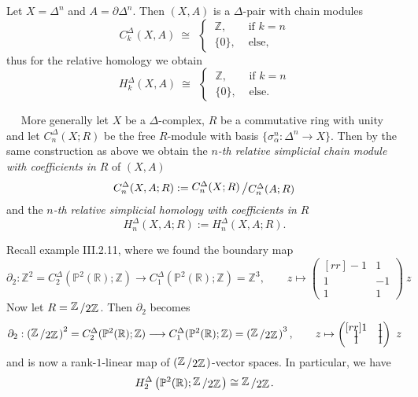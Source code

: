 \documentclass[11pt]{book}
\numberwithin{dummy}{section}
\theoremstyle{nonumberbreak}
\newenvironment{defin}[1][]{\ifthenelse{\equal{#1}{}}{\definition}{\definition[#1]}\rm}{\enddefinition}
\newenvironment{ex}[1][]{\ifthenelse{\equal{#1}{}}{\example}{\example[#1]}\rm}{\endexample}
\newcommand{\la}{\longrightarrow}
\newcommand{\slant}[2]{{\raisebox{.1em}{$#1$}\left/\raisebox{-.1em}{$#2$}\right.}}
\begin{document}
\begin{spacing}{1.4}
\begin{defin}
\end{defin}


\begin{ex}
Let $X= \Delta^n$ and $A= \partial \Delta^n$. Then $(X,A)$ is a $\Delta$-pair with chain modules
$$C_k^{\Delta}(X,A)\ \cong  \ \ \begin{cases} \ \mathbb{Z}, & \textrm{ if } k=n\\ \ \{0\}, & \textrm{ else,} \end{cases}$$
thus for the relative homology we obtain 
$$H_k^{\Delta}(X,A)\ \cong \ \ \begin{cases} \ \mathbb{Z}, & \textrm{ if } k=n\\ \ \{0\}, & \textrm{ else.} \end{cases}$$

\end{ex}



$\quad$ More generally let $X$ be a $\Delta$-complex, $R$ be a commutative ring with unity and let $C_n^{\Delta}(X;R)$ be the free $R$-module with basis $\{ \sigma_{\alpha}^n: \Delta^n \la X\}$. Then by the same construction as above we obtain the $n$\textit{-th relative simplicial chain module with coefficients in} $R$ of $(X,A)$
$$C_n^{\Delta}(X,A;R) := \slant{C_n^{\Delta}(X;R)}{C_n^{\Delta}(A;R)}$$
and the $n$\textit{-th relative simplicial homology with coefficients in} $R$
$$H_n^{\Delta}(X,A;R) := H_n^{\Delta}(X,A;R).$$

\begin{ex}
Recall example III.2.11, where we found the boundary map
$$\partial_2: \mathbb{Z}^2 = C_2^{\Delta}(\mathbb{P}^2(\mathbb{R}); \mathbb{Z}) \la C_1^{\Delta}(\mathbb{P}^2(\mathbb{R}); \mathbb{Z}) = \mathbb{Z}^3, \qquad z \mapsto \begin{pmatrix}[rr] -1 & 1 \\[-6pt] 1 & -1 \\[-6pt] 1 & 1 \end{pmatrix} \ z$$
Now let $R=\slant{\mathbb{Z}}{2 \mathbb{Z}}$. Then $\partial_2$ becomes
$$\partial_2: \left(\slant{\mathbb{Z}}{2 \mathbb{Z}}\right)^2 = C_2^{\Delta}(\mathbb{P}^2(\mathbb{R}); \mathbb{Z}) \la C_1^{\Delta}(\mathbb{P}^2(\mathbb{R}); \mathbb{Z}) = \left(\slant{\mathbb{Z}}{2 \mathbb{Z}}\right)^3, \qquad z \mapsto \begin{pmatrix}[rr] 1 & 1 \\[-6pt] 1 & 1 \\[-6pt] 1 & 1 \end{pmatrix} \ z$$
and is now a rank-$1$-linear map of $\left(\slant{\mathbb{Z}}{2 \mathbb{Z}}\right)$-vector spaces. In particular, we have
$$H_2^{\Delta}\left(\mathbb{P}^2(\mathbb{R}); \slant{\mathbb{Z}}{2 \mathbb{Z}} \right) \cong \slant{\mathbb{Z}}{2 \mathbb{Z}}.$$
\end{ex}



\end{spacing}
\end{document}
